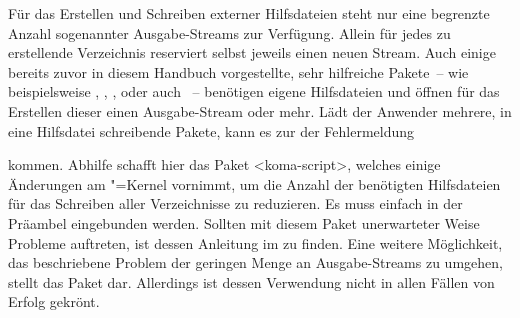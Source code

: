 %
Für das Erstellen und Schreiben externer Hilfsdateien steht  nur 
eine begrenzte Anzahl sogenannter Ausgabe-Streams zur Verfügung. Allein für 
jedes zu erstellende Verzeichnis reserviert  selbst jeweils einen 
neuen Stream. Auch einige bereits zuvor in diesem Handbuch vorgestellte, sehr 
hilfreiche Pakete~-- wie beispielsweise , , 
,  oder auch ~-- 
benötigen eigene Hilfsdateien und öffnen für das Erstellen dieser einen 
Ausgabe-Stream oder mehr. Lädt der Anwender mehrere, in eine Hilfsdatei 
schreibende Pakete, kann es zur der Fehlermeldung
%
\begin{quoting}
\end{quoting}
%
kommen. Abhilfe schafft hier das Paket <koma-script>, welches 
einige Änderungen am "=Kernel vornimmt, um die Anzahl der 
benötigten Hilfsdateien für das Schreiben aller Verzeichnisse zu reduzieren. Es 
muss einfach in der Präambel eingebunden werden. Sollten mit diesem Paket 
unerwarteter Weise Probleme auftreten, ist dessen Anleitung im \scrguide zu 
finden. Eine weitere Möglichkeit, das beschriebene Problem der geringen Menge 
an Ausgabe-Streams zu umgehen, stellt das Paket  dar. 
Allerdings ist dessen Verwendung nicht in allen Fällen von Erfolg gekrönt.
